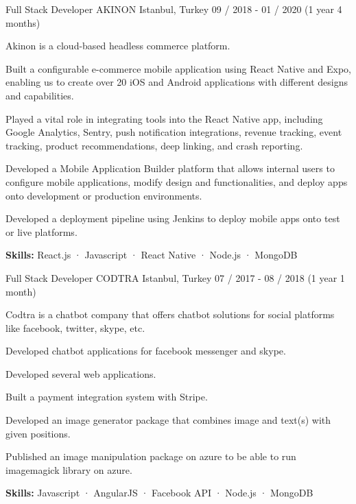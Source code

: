 \begin{cventries}
  \cventry
    {Full Stack Developer} %
    {AKINON} %
    {Istanbul, Turkey} %
    {09 / 2018 - 01 / 2020 (1 year 4 months)}
    {
      \begin{cvitems} %
        \item {Akinon is a cloud-based headless commerce platform.}
        \item {Built a configurable e-commerce mobile application using React Native and Expo, enabling us to create over 20 iOS and Android applications with different designs and capabilities.}
        \item {Played a vital role in integrating tools into the React Native app, including Google Analytics, Sentry, push notification integrations, revenue tracking, event tracking, product recommendations, deep linking, and crash reporting.}
        \item {Developed a Mobile Application Builder platform that allows internal users to configure mobile applications, modify design and functionalities, and deploy apps onto development or production environments.}
        \item {Developed a deployment pipeline using Jenkins to deploy mobile apps onto test or live platforms.}
        \item {\textbf {Skills:} React.js · Javascript · React Native · Node.js · MongoDB}
      \end{cvitems}
    }

  \cventry
    {Full Stack Developer} %
    {CODTRA} %
    {Istanbul, Turkey} %
    {07 / 2017 - 08 / 2018 (1 year 1 month)}
    {
      \begin{cvitems} %
        \item {Codtra is a chatbot company that offers chatbot solutions for social platforms like facebook, twitter, skype, etc.}
        \item {Developed chatbot applications for facebook messenger and skype.}
        \item {Developed several web applications.}
        \item {Built a payment integration system with Stripe.}
        \item {Developed an image generator package that combines image and text(s) with given positions.}
        \item {Published an image manipulation package on azure to be able to run imagemagick library on azure.}
        \item {\textbf {Skills:} Javascript · AngularJS · Facebook API · Node.js · MongoDB}
      \end{cvitems}
    }


\end{cventries}
